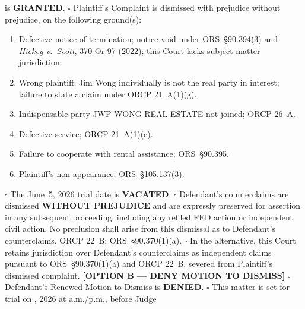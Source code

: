 \documentclass[10pt,letterpaper,oneside]{extarticle}
\begin{document}
is \textbf{GRANTED}.
\vspace{0.3em}
\noindent $\square$ Plaintiff's Complaint is dismissed
\underline{\hspace{1in}} with prejudice
\underline{\hspace{1in}} without prejudice, on the
following ground(s):
\vspace{0.3em}
\begin{enumerate}[label=$\square$,leftmargin=.5in,
itemsep=2pt]
\item Defective notice of termination; notice void
under ORS~\S90.394(3) and \textit{Hickey v.\ Scott},
370 Or 97 (2022); this Court lacks subject matter
jurisdiction.
\item Wrong plaintiff; Jim Wong individually is not
the real party in interest; failure to state a claim
under ORCP 21~A(1)(g).
\item Indispensable party JWP WONG REAL ESTATE not
joined; ORCP 26~A.
\item Defective service; ORCP 21~A(1)(e).
\item Failure to cooperate with rental assistance;
ORS~\S90.395.
\item Plaintiff's non-appearance; ORS~\S105.137(3).
\end{enumerate}
\vspace{0.3em}
\noindent $\square$ The June~5, 2026 trial date is
\textbf{VACATED}.
\vspace{0.3em}
\noindent $\square$ Defendant's counterclaims are
dismissed \textbf{WITHOUT PREJUDICE} and are expressly
preserved for assertion in any subsequent proceeding,
including any refiled FED action or independent civil
action. No preclusion shall arise from this dismissal
as to Defendant's counterclaims. ORCP 22~B;
ORS~\S90.370(1)(a).
\vspace{0.3em}
\noindent $\square$ In the alternative, this Court
retains jurisdiction over Defendant's counterclaims as
independent claims pursuant to ORS~\S90.370(1)(a) and
ORCP 22~B, severed from Plaintiff's dismissed complaint.
\vspace{0.5em}
\noindent \textbf{[OPTION B --- DENY MOTION TO DISMISS]}
\vspace{0.3em}
\noindent $\square$ Defendant's Renewed Motion to Dismiss
is \textbf{DENIED}.
\vspace{0.3em}
\noindent $\square$ This matter is set for trial on
\underline{\hspace{1.5in}}, 2026 at
\underline{\hspace{0.75in}} a.m./p.m., before Judge
\end{document}
